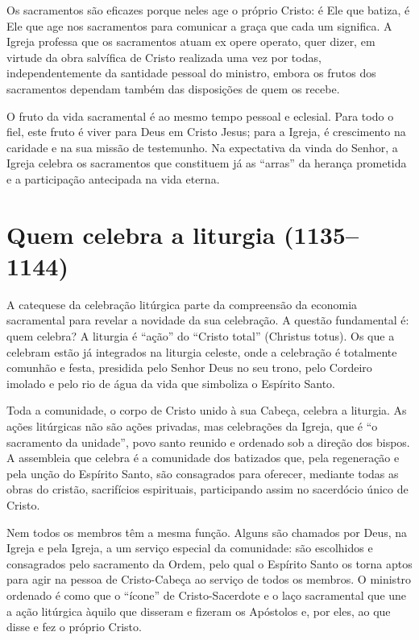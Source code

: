Os sacramentos são eficazes porque neles age o próprio Cristo: é Ele que batiza, é Ele que age nos sacramentos para comunicar a graça que cada um significa. A Igreja professa que os sacramentos atuam ex opere operato, quer dizer, em virtude da obra salvífica de Cristo realizada uma vez por todas, independentemente da santidade pessoal do ministro, embora os frutos dos sacramentos dependam também das disposições de quem os recebe.

O fruto da vida sacramental é ao mesmo tempo pessoal e eclesial. Para todo o fiel, este fruto é viver para Deus em Cristo Jesus; para a Igreja, é crescimento na caridade e na sua missão de testemunho. Na expectativa da vinda do Senhor, a Igreja celebra os sacramentos que constituem já as ``arras'' da herança prometida e a participação antecipada na vida eterna.

\section{Quem celebra a liturgia (1135--1144)}

A catequese da celebração litúrgica parte da compreensão da economia sacramental para revelar a novidade da sua celebração. A questão fundamental é: quem celebra? A liturgia é ``ação'' do ``Cristo total'' (Christus totus). Os que a celebram estão já integrados na liturgia celeste, onde a celebração é totalmente comunhão e festa, presidida pelo Senhor Deus no seu trono, pelo Cordeiro imolado e pelo rio de água da vida que simboliza o Espírito Santo.

Toda a comunidade, o corpo de Cristo unido à sua Cabeça, celebra a liturgia. As ações litúrgicas não são ações privadas, mas celebrações da Igreja, que é ``o sacramento da unidade'', povo santo reunido e ordenado sob a direção dos bispos. A assembleia que celebra é a comunidade dos batizados que, pela regeneração e pela unção do Espírito Santo, são consagrados para oferecer, mediante todas as obras do cristão, sacrifícios espirituais, participando assim no sacerdócio único de Cristo.

Nem todos os membros têm a mesma função. Alguns são chamados por Deus, na Igreja e pela Igreja, a um serviço especial da comunidade: são escolhidos e consagrados pelo sacramento da Ordem, pelo qual o Espírito Santo os torna aptos para agir na pessoa de Cristo-Cabeça ao serviço de todos os membros. O ministro ordenado é como que o ``ícone'' de Cristo-Sacerdote e o laço sacramental que une a ação litúrgica àquilo que disseram e fizeram os Apóstolos e, por eles, ao que disse e fez o próprio Cristo.


